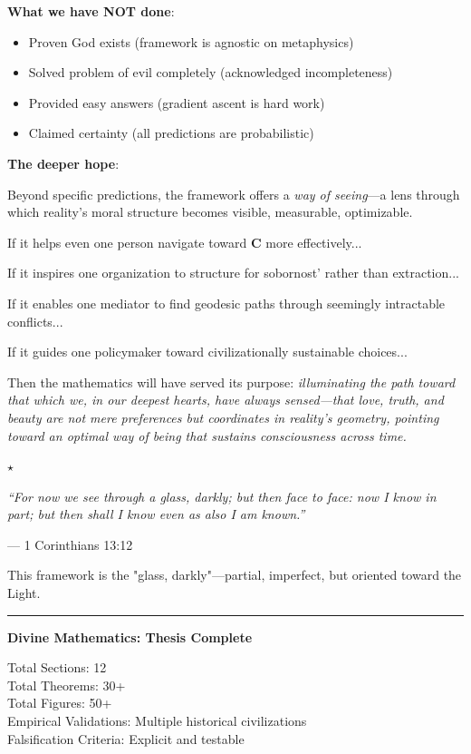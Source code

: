 \documentclass[11pt,a4paper]{article}
\theoremstyle{definition}
\theoremstyle{remark}
\begin{document}
\begin{small}
\begin{enumerate}
\textbf{What we have NOT done}:
\begin{itemize}
    \item Proven God exists (framework is agnostic on metaphysics)
    \item Solved problem of evil completely (acknowledged incompleteness)
    \item Provided easy answers (gradient ascent is hard work)
    \item Claimed certainty (all predictions are probabilistic)
\end{itemize}

\textbf{The deeper hope}:

Beyond specific predictions, the framework offers a \textit{way of seeing}—a lens through which reality's moral structure becomes visible, measurable, optimizable.

If it helps even one person navigate toward \(\mathbf{C}\) more effectively...

If it inspires one organization to structure for sobornost' rather than extraction...

If it enables one mediator to find geodesic paths through seemingly intractable conflicts...

If it guides one policymaker toward civilizationally sustainable choices...

Then the mathematics will have served its purpose: \textit{illuminating the path toward that which we, in our deepest hearts, have always sensed—that love, truth, and beauty are not mere preferences but coordinates in reality's geometry, pointing toward an optimal way of being that sustains consciousness across time.}

\begin{center}
\(\star\)
\end{center}

\textit{``For now we see through a glass, darkly; but then face to face: now I know in part; but then shall I know even as also I am known.''} 

— 1 Corinthians 13:12

This framework is the "glass, darkly"—partial, imperfect, but oriented toward the Light.

\begin{center}
\rule{0.5\linewidth}{0.5pt}

\textbf{Divine Mathematics: Thesis Complete}

Total Sections: 12\\
Total Theorems: 30+\\
Total Figures: 50+\\
Empirical Validations: Multiple historical civilizations\\
Falsification Criteria: Explicit and testable


\end{center}
\end{enumerate}
\end{small}
\end{document}
